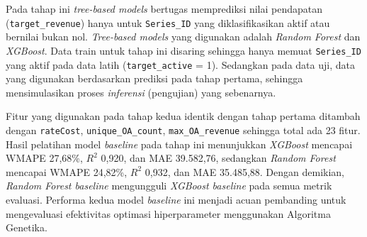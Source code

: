 Pada tahap ini \textit{tree-based models} bertugas memprediksi nilai pendapatan (\texttt{target\_revenue}) hanya untuk \texttt{Series\_ID} yang diklasifikasikan aktif atau bernilai bukan nol. \textit{Tree-based models} yang digunakan adalah \textit{Random Forest} dan \textit{XGBoost}. Data train untuk tahap ini disaring sehingga hanya memuat \texttt{Series\_ID} yang aktif pada data latih (\texttt{target\_active} = 1). Sedangkan pada data uji, data yang digunakan berdasarkan prediksi pada tahap pertama, sehingga mensimulasikan proses \textit{inferensi} (pengujian) yang sebenarnya.

Fitur yang digunakan pada tahap kedua identik dengan tahap pertama ditambah dengan \texttt{rateCost}, \texttt{unique\_OA\_count}, \texttt{max\_OA\_revenue} sehingga total ada 23 fitur. Hasil pelatihan model \textit{baseline} pada tahap ini menunjukkan \textit{XGBoost} mencapai WMAPE 27,68\%, $R^2$ 0,920, dan MAE 39.582,76, sedangkan \textit{Random Forest} mencapai WMAPE 24,82\%, $R^2$ 0,932, dan MAE 35.485,88. Dengan demikian, \textit{Random Forest baseline} mengungguli \textit{XGBoost baseline} pada semua metrik evaluasi. Performa kedua model \textit{baseline} ini menjadi acuan pembanding untuk mengevaluasi efektivitas optimasi hiperparameter menggunakan Algoritma Genetika.





